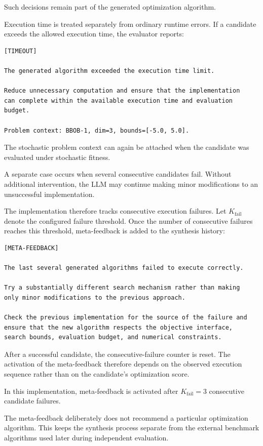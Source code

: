 Such decisions remain part of the generated optimization algorithm.

Execution time is treated separately from ordinary runtime errors. If a
candidate exceeds the allowed execution time, the evaluator reports:

\begin{verbatim}
[TIMEOUT]

The generated algorithm exceeded the execution time limit.

Reduce unnecessary computation and ensure that the implementation
can complete within the available execution time and evaluation
budget.

Problem context: BBOB-1, dim=3, bounds=[-5.0, 5.0].
\end{verbatim}

The stochastic problem context can again be attached when the candidate was
evaluated under stochastic fitness.

A separate case occurs when several consecutive candidates fail. Without
additional intervention, the LLM may continue making minor modifications to
an unsuccessful implementation.

The implementation therefore tracks consecutive execution failures. Let
$K_{\mathrm{fail}}$ denote the configured failure threshold. Once the number
of consecutive failures reaches this threshold, meta-feedback is added to the
synthesis history:

\begin{verbatim}
[META-FEEDBACK]

The last several generated algorithms failed to execute correctly.

Try a substantially different search mechanism rather than making
only minor modifications to the previous approach.

Check the previous implementation for the source of the failure and
ensure that the new algorithm respects the objective interface,
search bounds, evaluation budget, and numerical constraints.
\end{verbatim}

After a successful candidate, the consecutive-failure counter is reset. The
activation of the meta-feedback therefore depends on the observed execution
sequence rather than on the candidate's optimization score.

In this implementation, meta-feedback is activated after
$K_{\mathrm{fail}} = 3$ consecutive candidate failures.

The meta-feedback deliberately does not recommend a particular optimization
algorithm. This keeps the synthesis process separate from the external
benchmark algorithms used later during independent evaluation.

